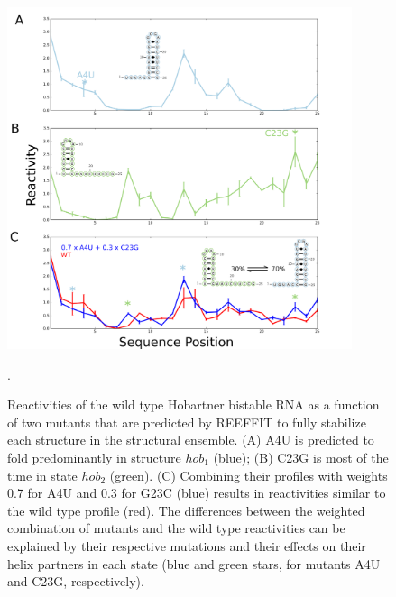 \documentclass[12pt]{article}
\begin{document}
\begin{figure}[here]
\includegraphics[width=0.9\textwidth]{figures/hobartnervalidation.png}
\caption{Reactivities of the wild type Hobartner bistable RNA as a function of two mutants that are predicted by REEFFIT to fully stabilize each structure in the structural ensemble. (A) A4U is predicted to fold predominantly in structure $hob_1$ (blue); (B) C23G is most of the time in state $hob_2$ (green). (C) Combining their profiles with weights 0.7 for A4U and 0.3 for G23C (blue) results in reactivities similar to the wild type profile (red). The differences between the weighted combination of mutants and the wild type reactivities can be explained by their respective mutations and their effects on their helix partners in each state (blue and green stars, for mutants A4U and C23G, respectively).}.
\label{fig:hobartnervalidationfig}
\end{figure}



\end{document}
